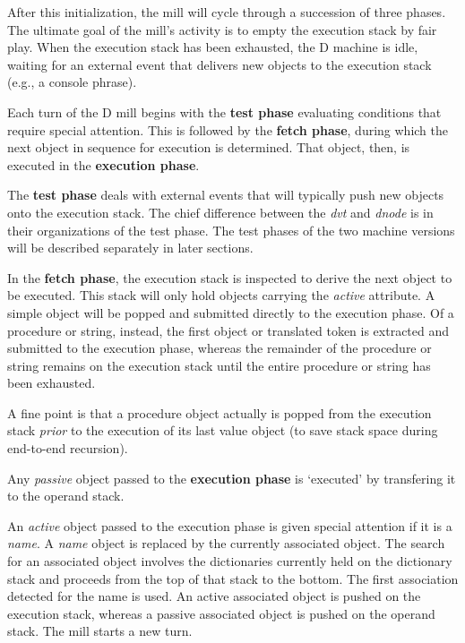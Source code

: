 After this initialization,  the mill will cycle through a succession  of three  phases.  The ultimate goal of the mill's activity is to empty  the execution stack by fair play. When the execution stack has been exhausted, the D machine is idle, waiting for an external event that delivers new objects to the execution stack (e.g., a console phrase).

Each  turn of the D mill  begins with the \textbf{test phase} evaluating conditions  that require special attention. This is followed by the \textbf{fetch phase},  during  which  the next object in sequence for execution is  determined.  That object, then, is executed in the \textbf{execution phase}.

The \textbf{test phase} deals with external events that will typically push new objects onto the execution stack. The chief difference between the \emph{dvt} and \emph{dnode} is in their organizations of the test phase. The test phases of the two machine versions will be described separately in later sections. 

In the \textbf{fetch    phase},    the   execution   stack   is   inspected    to derive the next object to be executed. This stack will only hold objects carrying the  \emph{active}  attribute.   A  simple  object   will be popped   and submitted directly to the  execution  phase.  Of a  procedure  or string, instead, the first object or translated token is extracted and submitted to the execution phase, whereas the remainder of the  procedure or string remains on the execution stack until the  entire procedure or string has been exhausted.

A fine point is that a procedure object actually is popped  from the  execution stack \emph{prior} to the execution of its last value object  (to save stack space during end-to-end recursion).

Any \emph{passive}  object  passed to the \textbf{execution  phase}  is  `executed'  by transfering it to the operand stack.

An  \emph{active} object passed to the execution phase is given special attention if it is a  \emph{name}.  A  \emph{name} object is replaced by the currently associated object.  The search for an associated  object  involves  the  dictionaries  currently  held  on  the dictionary  stack and proceeds from the top of  that  stack to the bottom. The first association detected for the name is used. An active associated object  is pushed on the execution stack,  whereas a  passive  associated object is pushed on the operand stack. The mill starts a new turn.

